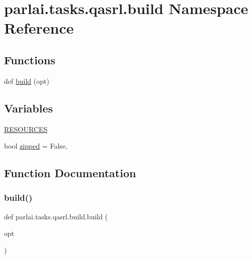 \hypertarget{namespaceparlai_1_1tasks_1_1qasrl_1_1build}{}\section{parlai.\+tasks.\+qasrl.\+build Namespace Reference}
\label{namespaceparlai_1_1tasks_1_1qasrl_1_1build}
\subsection*{Functions}
\begin{DoxyCompactItemize}
\item 
def \hyperlink{namespaceparlai_1_1tasks_1_1qasrl_1_1build_afe77ee1662611aab5f5520df1fc49ff6}{build} (opt)
\end{DoxyCompactItemize}
\subsection*{Variables}
\begin{DoxyCompactItemize}
\item 
\hyperlink{namespaceparlai_1_1tasks_1_1qasrl_1_1build_a04e7b9e28ecdcb659118ff07cffbef7a}{R\+E\+S\+O\+U\+R\+C\+ES}
\item 
bool \hyperlink{namespaceparlai_1_1tasks_1_1qasrl_1_1build_a22ac6ac5d31f50f3b6415e3c0901cafe}{zipped} = False,
\end{DoxyCompactItemize}


\subsection{Function Documentation}
\mbox{\label{namespaceparlai_1_1tasks_1_1qasrl_1_1build_afe77ee1662611aab5f5520df1fc49ff6}} 
\subsubsection{\texorpdfstring{build()}{build()}}
{\footnotesize\ttfamily def parlai.\+tasks.\+qasrl.\+build.\+build (\begin{DoxyParamCaption}\item[{}]{opt }\end{DoxyParamCaption})}



